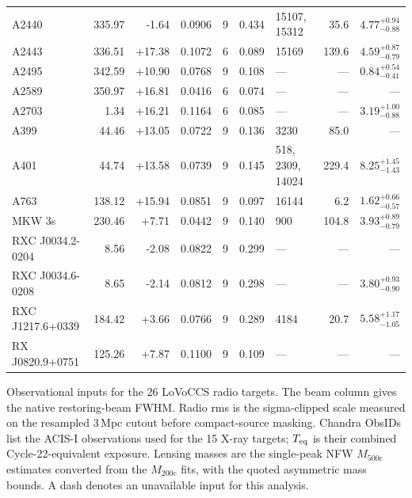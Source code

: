 \begin{table}
{\begin{tabular}{lrrrrrp{30mm}rr}
A2440 & 335.97 & -1.64 & 0.0906 & 9 & 0.434 & 15107, 15312 & 35.6 & $4.77^{+0.94}_{-0.88}$ \\
A2443 & 336.51 & +17.38 & 0.1072 & 6 & 0.089 & 15169 & 139.6 & $4.59^{+0.87}_{-0.79}$ \\
A2495 & 342.59 & +10.90 & 0.0768 & 9 & 0.108 & --- & --- & $0.84^{+0.54}_{-0.41}$ \\
A2589 & 350.97 & +16.81 & 0.0416 & 6 & 0.074 & --- & --- & --- \\
A2703 & 1.34 & +16.21 & 0.1164 & 6 & 0.085 & --- & --- & $3.19^{+1.00}_{-0.88}$ \\
A399 & 44.46 & +13.05 & 0.0722 & 9 & 0.136 & 3230 & 85.0 & --- \\
A401 & 44.74 & +13.58 & 0.0739 & 9 & 0.145 & 518, 2309, 14024 & 229.4 & $8.25^{+1.45}_{-1.43}$ \\
A763 & 138.12 & +15.94 & 0.0851 & 9 & 0.097 & 16144 & 6.2 & $1.62^{+0.66}_{-0.57}$ \\
MKW 3s & 230.46 & +7.71 & 0.0442 & 9 & 0.140 & 900 & 104.8 & $3.93^{+0.89}_{-0.79}$ \\
RXC J0034.2-0204 & 8.56 & -2.08 & 0.0822 & 9 & 0.299 & --- & --- & --- \\
RXC J0034.6-0208 & 8.65 & -2.14 & 0.0812 & 9 & 0.298 & --- & --- & $3.80^{+0.93}_{-0.90}$ \\
RXC J1217.6+0339 & 184.42 & +3.66 & 0.0766 & 9 & 0.289 & 4184 & 20.7 & $5.58^{+1.17}_{-1.05}$ \\
RX J0820.9+0751 & 125.26 & +7.87 & 0.1100 & 9 & 0.109 & --- & --- & --- \\
\bottomrule
\end{tabular}}
\par\medskip\raggedright
Observational inputs for the 26 LoVoCCS radio targets. The beam column
gives the native restoring-beam FWHM. Radio rms is the sigma-clipped
scale measured on the resampled 3\,Mpc cutout before compact-source
masking. Chandra ObsIDs list the
ACIS-I observations used for the 15 X-ray targets; $T_{\rm eq}$ is their
combined Cycle-22-equivalent exposure. Lensing masses are the
single-peak NFW $M_{500\mathrm{c}}$ estimates converted from the
$M_{200\mathrm{c}}$ fits, with the quoted asymmetric mass bounds.
A dash denotes an unavailable input for this analysis.
\end{table}
\fi
